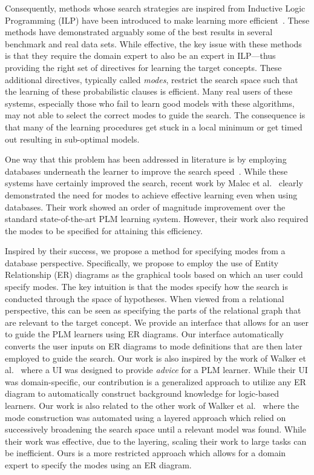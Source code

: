 \documentclass[sigconf]{acmart}
\begin{document}
Consequently, methods whose search strategies are inspired from Inductive Logic Programming (ILP) have been introduced to make learning more efficient~\cite{natarajan2015boosted,natarajan10}. These methods have demonstrated arguably some of the best results in several benchmark and real data sets. While effective, the key issue with these methods is that they require the domain expert to also be an expert in ILP---thus providing the right set of directives for learning the target concepts. These additional directives, typically
called {\em modes}, restrict the search space such that the learning of these probabilistic clauses is efficient. Many real users of these systems, especially those who fail to learn good models with these algorithms, may not able to select the correct modes to guide the search.
The consequence is that many of the learning procedures get stuck in a local minimum or get timed out resulting in sub-optimal models.

One way that this problem has been addressed in literature is by employing databases underneath the learner to improve the search speed~\cite{malec2016inductive,zeng2014quickfoil,niuvldb11}. While these systems have certainly improved the search, recent work by Malec et al.~\cite{malec2016inductive} clearly demonstrated the need for modes to achieve effective learning even when using databases. Their work showed an order of magnitude improvement over the standard state-of-the-art PLM learning system. However, their work also required the modes to be specified for attaining this efficiency.

Inspired by their success, we propose a method for specifying modes from a database perspective. Specifically, we propose to employ the use of Entity Relationship (ER) diagrams  as the graphical tools based on which an user could specify modes. The key intuition is that the modes specify how the search is conducted through the space of hypotheses. When viewed from a relational perspective, this can be seen as specifying the parts of the relational graph that are relevant to the target concept. We provide an interface that allows for an user to guide the PLM learners using ER diagrams. Our interface automatically converts the user inputs on ER diagrams to mode definitions that are then later employed to guide the search. Our work is also inspired by the work of Walker et al.~\cite{walker2011integrating} where a UI was designed to provide {\em advice} for
a PLM learner. While their UI was domain-specific, our contribution is a generalized approach to utilize any ER diagram to automatically construct background knowledge for logic-based learners. Our work is also related to the other work of Walker et al.~\cite{walker2010automating} where the mode construction was automated using a layered approach which relied on successively broadening the search space until a relevant model was found.  While their work was effective, due to the layering, scaling their work to large tasks can be inefficient. Ours is a more restricted approach which allows for a domain expert to specify the modes using an ER diagram.
\end{document}
